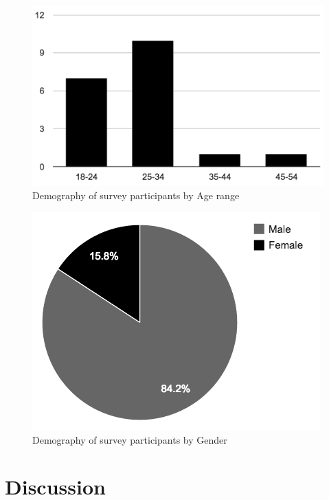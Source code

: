 \documentclass{sigchi}
\begin{document}
\begin{figure}[ht]
  \centering
  \includegraphics[width=\columnwidth]{figures/demography_age.png}
  \caption{Demography of survey participants by Age range}
  \label{fig:demography_age}
\end{figure}

\begin{figure}[ht]
  \centering
  \includegraphics[width=\columnwidth]{figures/demography_gender.png}
  \caption{Demography of survey participants by Gender}
  \label{fig:demography_gender}
\end{figure}


\section{Discussion}

\end{document}
